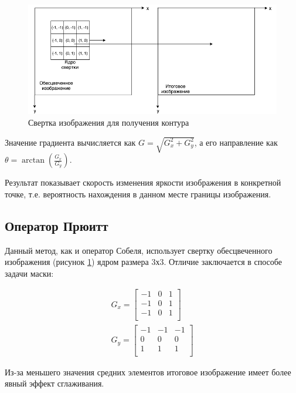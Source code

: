 \begin{figure}[!h]
	\centering
	\includegraphics[width=\textwidth,keepaspectratio]{figures/ru/sobel.png}
	\caption{Свертка изображения для получения контура}
	\label{fig:sobel}
\end{figure}

Значение градиента вычисляется как $G=\sqrt{G_x^2+G_y^2}$, а его направление как $\theta=\arctan(\frac{G_x}{G_y})$.

Результат показывает скорость изменения яркости изображения в конкретной точке, т.е. вероятность нахождения в данном месте границы изображения.

\subsection{Оператор Прюитт}

Данный метод\cite{Prewitt}, как и оператор Собеля, использует свертку обесцвеченного изображения (рисунок \ref{fig:sobel}) ядром размера 3х3. Отличие заключается в способе задачи маски:

\begin{eqnarray}\label{eq:prewitt-matrixs}
G_x = \begin{bmatrix}
-1 & 0 & 1\\
-1 & 0 & 1\\
-1 & 0 & 1\\
\end{bmatrix} \\
G_y = \begin{bmatrix}
-1 & -1 & -1\\
0 & 0 & 0\\
1 & 1 & 1\\
\end{bmatrix}
\end{eqnarray}

Из-за меньшего значения средних элементов итоговое изображение имеет более явный эффект сглаживания.

